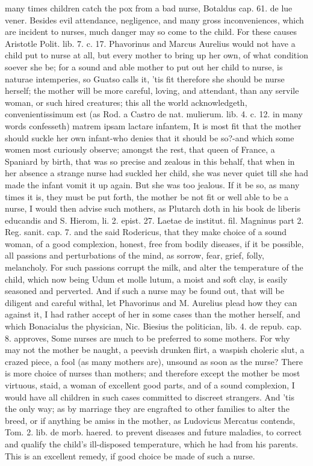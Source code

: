 {many times children catch the pox from a bad nurse, Botaldus cap. 61.
de lue vener. Besides evil attendance, negligence, and many gross
inconveniences, which are incident to nurses, much danger may so come
to the child. For these causes Aristotle Polit. lib. 7. c. 17.
Phavorinus and Marcus Aurelius would not have a child put to nurse at
all, but every mother to bring up her own, of what condition soever she
be; for a sound and able mother to put out her child to nurse, is
naturae intemperies, so Guatso calls it, 'tis fit therefore she
should be nurse herself; the mother will be more careful, loving, and
attendant, than any servile woman, or such hired creatures; this all
the world acknowledgeth, convenientissimum est (as Rod. a Castro de
nat. mulierum. lib. 4. c. 12. in many words confesseth) matrem ipsam
lactare infantem, It is most fit that the mother should suckle her own
infant-who denies that it should be so?-and which some women most
curiously observe; amongst the rest, that queen of France, a
Spaniard by birth, that was so precise and zealous in this behalf, that
when in her absence a strange nurse had suckled her child, she was
never quiet till she had made the infant vomit it up again. But she was
too jealous. If it be so, as many times it is, they must be put forth,
the mother be not fit or well able to be a nurse, I would then advise
such mothers, as Plutarch doth in his book de liberis educandis
and S. Hierom, li. 2. epist. 27. Laetae de institut. fil.
Magninus part 2. Reg. sanit. cap. 7. and the said Rodericus, that they
make choice of a sound woman, of a good complexion, honest, free from
bodily diseases, if it be possible, all passions and perturbations of
the mind, as sorrow, fear, grief, folly, melancholy. For such
passions corrupt the milk, and alter the temperature of the child,
which now being  Udum et molle lutum, a moist and soft clay, is
easily seasoned and perverted. And if such a nurse may be found out,
that will be diligent and careful withal, let Phavorinus and M.
Aurelius plead how they can against it, I had rather accept of her in
some cases than the mother herself, and which Bonacialus the physician,
Nic. Biesius the politician, lib. 4. de repub. cap. 8. approves,
Some nurses are much to be preferred to some mothers. For why may
not the mother be naught, a peevish drunken flirt, a waspish choleric
slut, a crazed piece, a fool (as many mothers are), unsound as soon as
the nurse? There is more choice of nurses than mothers; and therefore
except the mother be most virtuous, staid, a woman of excellent good
parts, and of a sound complexion, I would have all children in such
cases committed to discreet strangers. And 'tis the only way; as by
marriage they are engrafted to other families to alter the breed, or if
anything be amiss in the mother, as Ludovicus Mercatus contends, Tom.
2. lib. de morb. haered. to prevent diseases and future maladies, to
correct and qualify the child's ill-disposed temperature, which he had
from his parents. This is an excellent remedy, if good choice be made
of such a nurse.

}
